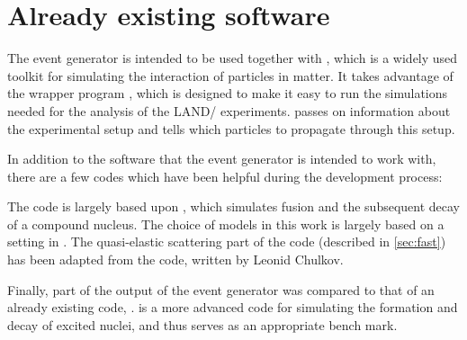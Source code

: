 \section{Already existing software}
\label{sec:exsoft}
The event generator is intended to be used together with , which is a widely used toolkit for simulating the interaction of particles in matter\cite{allison:2006:art}. It takes advantage of the wrapper program \cite{johansson:2013:online}, which is designed to make it easy to run the simulations needed for the analysis of the LAND/\rtb{} experiments.  passes on information about the experimental setup and tells  which particles to propagate through this setup.

In addition to the software that the event generator is intended to work with, there are a few codes which have been helpful during the development process:

The code is largely based upon \cite{gollerthan:1988:thesis}, which simulates fusion and the subsequent decay of a compound nucleus. The choice of models in this work is largely based on a setting in .
The quasi-elastic scattering part of the code (described in \autoref{sec:fast}) has been adapted from the  code, written by Leonid Chulkov.

Finally, part of the output of the event generator was compared to that of an already existing code, \cite{talys:2015}.  is a more advanced code for simulating the formation and decay of excited nuclei, and thus serves as an appropriate bench mark. %